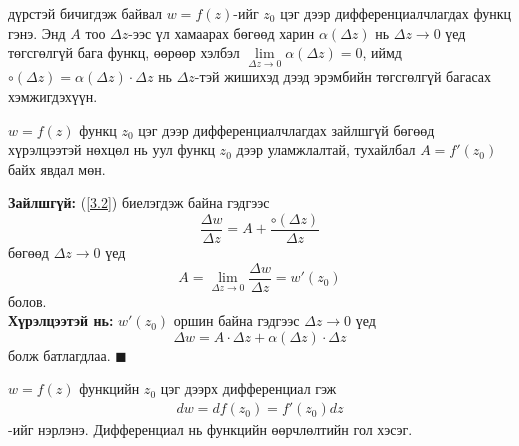 дүрстэй бичигдэж байвал $w=f(z)$-ийг $z_0$ цэг дээр дифференциалчлагдах функц гэнэ. Энд $A$ тоо $\Delta z$-ээс үл хамаарах бөгөөд харин $\alpha (\Delta z)$ нь $\Delta z\rightarrow 0$ үед төгсгөлгүй бага функц, өөрөөр хэлбэл $\lim\limits_{\Delta z\rightarrow 0}\alpha (\Delta z)=0$, иймд $\circ (\Delta z)=\alpha (\Delta z)\cdot \Delta z$ нь $\Delta z$-тэй жишихэд дээд эрэмбийн төгсгөлгүй багасах хэмжигдэхүүн.
\begin{thm}
$w=f(z)$ функц $z_0$ цэг дээр дифференциалчлагдах зайлшгүй бөгөөд хүрэлцээтэй нөхцөл нь уул функц $z_0$ дээр уламжлалтай, тухайлбал $A=f'(z_0)$ байх явдал мөн.
\end{thm}
\begin{prf}
\textbf{Зайлшгүй:} (\ref{3.2}) биелэгдэж байна гэдгээс
$$\frac{\Delta w}{\Delta z}=A+\frac{\circ (\Delta z)}{\Delta z}$$ бөгөөд $\Delta z \rightarrow 0$ үед 
$$A=\lim\limits_{\Delta z \rightarrow 0} \frac{\Delta w}{\Delta z}=w'(z_0)$$ болов. \\
\textbf{Хүрэлцээтэй нь:} $w'(z_0)$ оршин байна гэдгээс $\Delta z\rightarrow 0$ үед
$$\Delta w=A\cdot \Delta z+\alpha (\Delta z)\cdot \Delta z$$ болж батлагдлаа.
\hfill $\blacksquare$\end{prf}
$w=f(z)$ функцийн $z_0$ цэг дээрх дифференциал  гэж
\begin{eqnarray}
 dw=df(z_0)=f'(z_0)dz
\end{eqnarray}-ийг нэрлэнэ. Дифференциал нь функцийн өөрчлөлтийн гол хэсэг.

